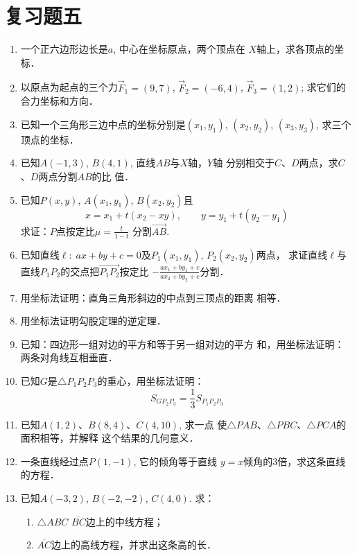 \section*{复习题五}

\begin{enumerate}
    \item 一个正六边形边长是$a$, 中心在坐标原点，两个顶点在
    $X$轴上，求各顶点的坐标．
    \item 以原点为起点的三个力$\vec{F}_1=(9,7)$, $\vec{F}_2=(-6,4)$, 
    $\vec{F}_3=(1,2)$; 求它们的合力坐标和方向．
    \item 已知一个三角形三边中点的坐标分别是$(x_1,y_1)$, $(x_2,
    y_2)$, $(x_3,y_3)$, 求三个顶点的坐标．
    \item 已知$A(-1,3)$, $B(4,1)$, 直线$AB$与$X$轴，$Y$轴
    分别相交于$C$、$D$两点，求$C$、$D$两点分割$AB$的比
    值．
    \item 已知$P(x,y)$, $A(x_1,y_1)$, $B(x_2,y_2)$且
    \[x=x_1+t(x_2-xy),\qquad y=y_1+t(y_2-y_1)\]
    求证：$P$点按定比$\mu=\frac{t}{1-t}$
    分割$\Vec{AB}$.
    \item 已知直线$\ell:\; ax+by+c=0$及$P_1(x_1,y_1)$, $P_2(x_2,  y_2)$两点，
    求证直线$\ell$与直线$P_1P_2$的交点把$\Vec{P_1P_2}$按定比
$-\frac{ax_1+by_1+c}{ax_2+by_2+c}$分割．
\item 用坐标法证明：直角三角形斜边的中点到三顶点的距离
相等．
\item 用坐标法证明勾股定理的逆定理．
\item 已知：四边形一组对边的平方和等于另一组对边的平方
和，用坐标法证明：两条对角线互相垂直．
\item 已知$G$是$\triangle P_1P_2P_3$的重心，用坐标法证明：
\[S_{GP_2P_3}=\frac{1}{3}S_{P_1P_2P_3}\]
\item 已知$A(1,2)$、$B(8,4)$、$C(4,10)$, 求一点
使$\triangle PAB$、$\triangle PBC$、$\triangle PCA$的面积相等，并解释
这个结果的几何意义．
\item 一条直线经过点$P(1,-1)$, 它的倾角等于直线
$y=x$倾角的3倍，求这条直线的方程．
\item 已知$A(-3,2)$, $B(-2,-2)$, $C(4,0)$. 求：
\begin{enumerate}
    \item $\triangle ABC$ $\overline{BC}$边上的中线方程；
    \item $\overline{AC}$边上的高线方程，并求出这条高的长．
\end{enumerate}


\end{enumerate}
